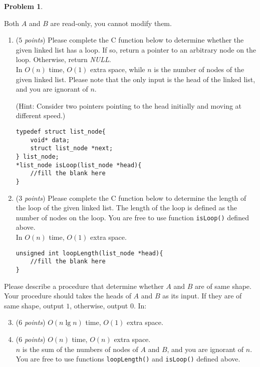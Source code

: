 \documentclass[12pt,a4paper]{report}
\newcommand{\points}[1]{ ($#1$ \textit{points}) }
\theoremstyle{definition}
\newtheorem{problem}{\textbf{Problem}}
\theoremstyle{definition}
\begin{document}
\begin{problem}
\begin{enumerate}[label=\arabic*.]
        Both $A$ and $B$ are read-only, you cannot modify them.
    \begin{enumerate}[label=\alph*.]
        \item \points{5}Please complete the C function below to determine whether the given linked list has a loop. If so, return a pointer to an arbitrary node on the loop.  Otherwise, return \textit{NULL}.\\
        In $O(n)$ time, $O(1)$ extra space, while $n$ is the number of nodes of the given linked list. Please note that the only input is the head of the linked list, and you are ignorant of $n$.

        (Hint: Consider two pointers pointing to the head initially and moving at different speed.)

\begin{lstlisting}
typedef struct list_node{
    void* data;
    struct list_node *next;
} list_node;
*list_node isLoop(list_node *head){
    //fill the blank here
}
\end{lstlisting}

        \item \points{3}Please complete the C function below to determine the length of the loop of the given linked list. The length of the loop is defined as the number of nodes on the loop. You are free to use function \texttt{isLoop()} defined above.\\
        In $O(n)$ time, $O(1)$ extra space.

\begin{lstlisting}
unsigned int loopLength(list_node *head){
    //fill the blank here
}
\end{lstlisting}
\end{enumerate}
        Please describe a procedure that determine whether $A$ and $B$ are of same shape. Your procedure should takes the heads of $A$ and $B$ as its input. If they are of same shape, output $1$, otherwise, output $0$. In:
\begin{enumerate}[label=\alph*.]
    \setcounter{enumii}{2}
        \item \points{6}$O(n \lg n)$ time, $O(1)$ extra space.
        \item \points{6}$O(n)$ time, $O(n)$ extra space.\\
    \noindent $n$ is the sum of the numbers of nodes of $A$ and $B$, and you are ignorant of $n$. You are free to use functions \texttt{loopLength()} and \texttt{isLoop()} defined above.
    \end{enumerate}

\end{enumerate}
\end{problem}
\end{document}
